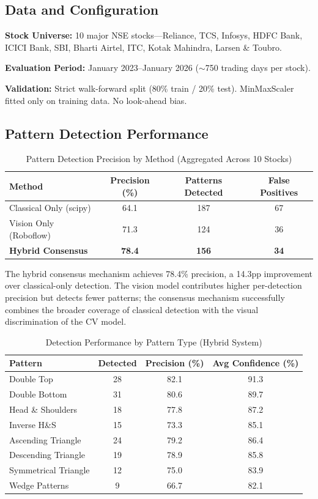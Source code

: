 \documentclass[12pt,a4paper]{article}
\begin{document}
\subsection{Data and Configuration}

\textbf{Stock Universe:} 10 major NSE stocks---Reliance, TCS, Infosys, HDFC Bank, ICICI Bank, SBI, Bharti Airtel, ITC, Kotak Mahindra, Larsen \& Toubro.

\textbf{Evaluation Period:} January 2023--January 2026 ($\sim$750 trading days per stock).

\textbf{Validation:} Strict walk-forward split (80\% train / 20\% test). MinMaxScaler fitted only on training data. No look-ahead bias.

\subsection{Pattern Detection Performance}

\begin{table}[H]
\centering
\caption{Pattern Detection Precision by Method (Aggregated Across 10 Stocks)}
\begin{tabular}{@{}lccc@{}}
\toprule
\textbf{Method} & \textbf{Precision (\%)} & \textbf{Patterns Detected} & \textbf{False Positives} \\
\midrule
Classical Only (scipy) & 64.1 & 187 & 67 \\
Vision Only (Roboflow) & 71.3 & 124 & 36 \\
\textbf{Hybrid Consensus} & \textbf{78.4} & \textbf{156} & \textbf{34} \\
\bottomrule
\end{tabular}
\label{tab:pattern_precision}
\end{table}

The hybrid consensus mechanism achieves 78.4\% precision, a 14.3pp improvement over classical-only detection. The vision model contributes higher per-detection precision but detects fewer patterns; the consensus mechanism successfully combines the broader coverage of classical detection with the visual discrimination of the CV model.

\begin{table}[H]
\centering
\caption{Detection Performance by Pattern Type (Hybrid System)}
\begin{tabular}{@{}lccc@{}}
\toprule
\textbf{Pattern} & \textbf{Detected} & \textbf{Precision (\%)} & \textbf{Avg Confidence (\%)} \\
\midrule
Double Top & 28 & 82.1 & 91.3 \\
Double Bottom & 31 & 80.6 & 89.7 \\
Head \& Shoulders & 18 & 77.8 & 87.2 \\
Inverse H\&S & 15 & 73.3 & 85.1 \\
Ascending Triangle & 24 & 79.2 & 86.4 \\
Descending Triangle & 19 & 78.9 & 85.8 \\
Symmetrical Triangle & 12 & 75.0 & 83.9 \\
Wedge Patterns & 9 & 66.7 & 82.1 \\
\bottomrule
\end{tabular}
\label{tab:pattern_by_type}
\end{table}
\end{document}
